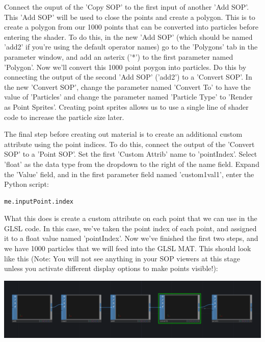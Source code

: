 \begin{fullwidth}
Connect the ouput of the 'Copy SOP' to the first input of another 'Add SOP'. This 'Add SOP' will be used to close the points and create a polygon. This is to create a polygon from our 1000 points that can be converted into particles before entering the shader. To do this, in the new 'Add SOP' (which should be named 'add2' if you're using the default operator names) go to the 'Polygons' tab in the parameter window, and add an asterix ('*') to the first parameter named 'Polygon'. Now we'll convert this 1000 point poygon into particles. Do this by connecting the output of the second 'Add SOP' ('add2') to a 'Convert SOP'. In the new 'Convert SOP', change the parameter named 'Convert To' to have the value of 'Particles' and change the parameter named 'Particle Type' to 'Render as Point Sprites'. Creating point sprites allows us to use a single line of shader code to increase the particle size later.

The final step before creating out material is to create an additional custom attribute using the point indices. To do this, connect the output of the 'Convert SOP' to a 'Point SOP'. Set the first 'Custom Attrib' name to 'pointIndex'. Select 'float' as the data type from the dropdown to the right of the name field. Expand the 'Value' field, and in the first parameter field named 'custom1val1', enter the Python script:

\begin{lstlisting}
me.inputPoint.index
\end{lstlisting}

What this does is create a custom attribute on each point that we can use in the GLSL code. In this case, we've taken the point index of each point, and assigned it to a float value named 'pointIndex'. Now we've finished the first two steps, and we have 1000 particles that we will feed into the GLSL MAT. This should look like this (Note: You will not see anything in your SOP viewers at this stage unless you activate different display options to make points visible!):

\begin{center}
\includegraphics{./img/12.6.2/step1_2.png}
\end{center}


\end{fullwidth}
